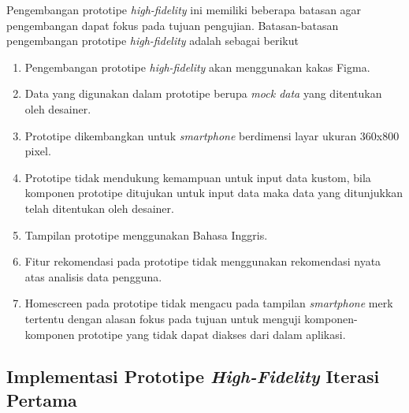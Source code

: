 Pengembangan prototipe \textit{high-fidelity} ini memiliki beberapa batasan agar pengembangan dapat fokus pada tujuan pengujian. Batasan-batasan pengembangan prototipe \textit{high-fidelity} adalah sebagai berikut

\begin{enumerate}
  \item Pengembangan prototipe \textit{high-fidelity} akan menggunakan kakas Figma.
  \item Data yang digunakan dalam prototipe berupa \textit{mock data} yang ditentukan oleh desainer.
  \item Prototipe dikembangkan untuk \textit{smartphone} berdimensi layar ukuran 360x800 pixel.
  \item Prototipe tidak mendukung kemampuan untuk input data kustom, bila komponen prototipe ditujukan untuk input data maka data yang ditunjukkan telah ditentukan oleh desainer.
  \item Tampilan prototipe menggunakan Bahasa Inggris. 
  \item Fitur rekomendasi pada prototipe tidak menggunakan rekomendasi nyata atas analisis data pengguna.
  \item Homescreen pada prototipe tidak mengacu pada tampilan \textit{smartphone} merk tertentu dengan alasan fokus pada tujuan untuk menguji komponen-komponen prototipe yang tidak dapat diakses dari dalam aplikasi.
\end{enumerate}

\subsection{Implementasi Prototipe \textit{High-Fidelity} Iterasi Pertama}
\label{subsec:hifi_1_implementasi}


  
